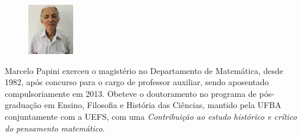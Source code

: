 \documentclass{hipatia}
\begin{document}


\vspace{1cm}
\begin{figure}
	\vspace{-10pt}
	\centering
	\includegraphics[width=2cm]{papini.jpg}
\end{figure}\noindent
Marcelo Papini 
exerceu o magistério no Departamento de Matemática, desde 1982,  após concurso para o cargo de professor auxiliar, sendo aposentado compulsoriamente em 2013. Obeteve o doutoramento no programa de pós-graduação em Ensino, Filosofia e História das Ciências, mantido pela UFBA conjuntamente com a UEFS, com uma \emph{Contribuição ao estudo histórico e crítico do pensamento matemático}.
\end{document}
